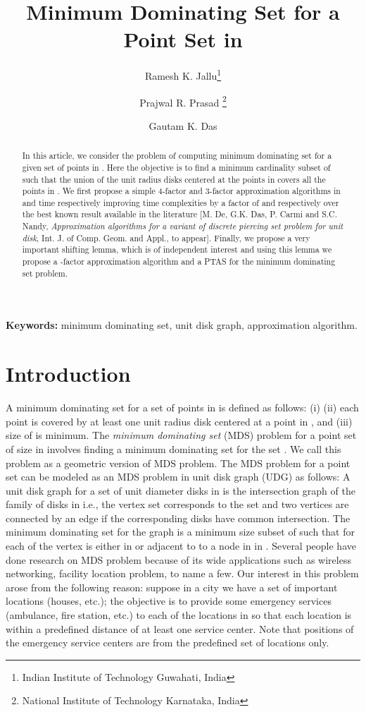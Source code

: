 \documentclass[a4paper,11pt]{article}
\title{Minimum Dominating Set for a Point Set in }
\author{Ramesh K. Jallu\thanks{Indian Institute of Technology Guwahati,
India}
\and Prajwal R. Prasad \thanks{National Institute of Technology Karnataka, India}
\and Gautam K. Das \footnotemark[1]}
\date{}
\begin{document}
\maketitle
\begin{abstract}
In this article, we consider the problem of computing minimum dominating set for a given set  
of  points in . Here the objective is to find a minimum cardinality 
subset  of  such that the union of the unit radius disks centered at the points in  covers 
all the points in . We first propose a simple 4-factor and 3-factor approximation algorithms in  
and  time respectively improving time complexities by a factor of  and 
 respectively over the best known result available in the literature 
[M. De, G.K. Das, P. Carmi and S.C. Nandy, {\it Approximation 
algorithms for a variant of discrete piercing set problem for unit disk}, Int. J. of Comp. Geom. and Appl., 
to appear]. Finally, we propose a very important shifting lemma, which is of independent 
interest and using this lemma we propose a -factor approximation algorithm and a PTAS for 
the minimum dominating set problem. 
\end{abstract}

{\bf Keywords:} minimum dominating set, unit disk graph, approximation algorithm.


\section{Introduction}
A minimum dominating set  for a set  of  points in  is defined as follows: (i)  
(ii) each point  is covered by at least one unit radius disk centered at a point in , and (iii) size of 
 is minimum. The {\it minimum dominating set} (MDS) problem for a point set  of size  in  
involves finding a minimum dominating set  for the set . We call this problem as a geometric version of 
MDS problem. The MDS problem for a point set can be modeled  
as an MDS problem in unit disk graph (UDG) as follows: A unit disk graph  for a set  of  
unit diameter disks in  is the intersection graph of the family of disks in  i.e., the vertex 
set  corresponds to the set  and two vertices are connected by an edge if the corresponding disks have 
common intersection. The minimum dominating set for the graph  is a minimum size subset  of  such 
that for each of the vertex  is either in  or adjacent to to a node in  in . Several people have done 
research on MDS problem because of its wide applications such as wireless networking,  
facility location problem, to name a few. Our interest in this problem arose from the following reason: 
suppose in a city we have a set  of  important locations (houses, etc.); the objective is to provide 
some emergency services (ambulance, fire station, etc.) to each of the locations in  so that 
each location is within a predefined distance of at least one service center. Note that positions of the 
emergency service centers are from the predefined set  of locations only. 
\end{document}
